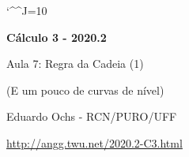 \documentclass[oneside,12pt]{article}
\begin{document}
\catcode`\^^J=10


\long{}
\long{}
\long{}
\long{}
\long{}
\long{}
\long{}
\long{}
\long{}
\long{}
\long{}

\long{}
\long{}

\def\frown{\ensuremath{{=}{(}}}
\def\True {\mathbf{V}}
\def\False{\mathbf{F}}
\def\D    {\displaystyle}

\def\drafturl{http://angg.twu.net/LATEX/2020-2-C3.pdf}
\def\drafturl{http://angg.twu.net/2020.2-C3.html}
\def\draftfooter{\tiny \href{\drafturl}{\jobname{}} \ColorBrown{\shorttoday{} \hours}}



%

\thispagestyle{empty}

\begin{center}

\vspace*{1.2cm}

{\bf \Large Cálculo 3 - 2020.2}

\bsk

Aula 7: Regra da Cadeia (1)

(E um pouco de curvas de nível)

\bsk

Eduardo Ochs - RCN/PURO/UFF

\url{http://angg.twu.net/2020.2-C3.html}

\end{center}
\end{document}
